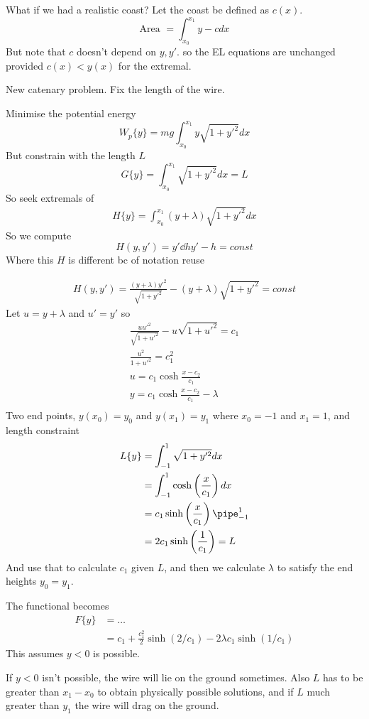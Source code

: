 \documentclass{X:/Documents/Coding/Latex/myassignment}
\begin{document}
What if we had a realistic coast?
Let the coast be defined as $c(x)$.
\[\text{Area } = \int_{x_0}^{x_1} y - c dx\]
But note that $c$ doesn't depend on $y,y'$. so the EL equations are unchanged provided $c(x) < y(x)$ for the extremal.


New catenary problem. Fix the length of the wire.

Minimise the potential energy
\[W_p\{y\} = mg \int_{x_0}^{x_1} y\sqrt{1+y'^2} dx\]
But constrain with the length $L$
\[G\{y\} = \int_{x_0}^{x_1} \sqrt{1+y'^2} dx = L\]
So seek extremals of
\begin{align*}
	H\{y\} = \int_{x_0}^{x_1} (y+\lambda) \sqrt{1+y'^2} dx
\end{align*}
So we compute
\[H(y,y') = y' \dd h{y'} - h = const\]
Where this $H$ is different bc of notation reuse

\begin{align*}
	H(y,y') = \frac{(y+\lambda) y'^2}{\sqrt{1+y'^2}} - (y+\lambda)\sqrt{1+y'^2} = const
\end{align*}
Let $ u = y+\lambda$ and $u' = y'$ so
\begin{align*}
	\frac{uu'^2}{\sqrt{1+u'^2}} - u\sqrt{1+u'^2} = c_1\\
	\frac{u^2}{1+u'^2} = c_1^2\\
	u = c_1 \cosh \frac{x-c_2}{c_1}\\
	y = c_1 \cosh \frac{x-c_2}{c_1} - \lambda\\
\end{align*}
Two end points, $y(x_0) = y_0$ and $y(x_1) = y_1$ where $x_0 = -1$ and $x_1 = 1$, and length constraint
\begin{align*}
	L\{y\} &= \int_{-1}^1 \sqrt{1+y'^2} dx\\
	&= \int_{-1}^1 \cosh \left(\frac{x}{c_1}\right) dx\\
	&= c_1 \sinh \left(\frac{x}{c_1}\right)\pipe_{-1}^1\\
	&= 2c_1 \sinh\left(\frac{1}{c_1}\right) = L
\end{align*}
And use that to calculate $c_1$ given $L$, and then we calculate $\lambda$ to satisfy the end heights $y_0=y_1$.

The functional becomes
\begin{align*}
	F\{y\} &= \ldots\\
	&=c_1 + \frac{c_1^2}{2} \sinh(2/c_1) - 2 \lambda c_1 \sinh(1/c_1)
\end{align*}
This assumes $y<0$ is possible.



If $y<0$ isn't possible, the wire will lie on the ground sometimes. 
Also $L$ has to be greater than $x_1 - x_0$ to obtain physically possible solutions, and if $L$ much greater than $y_1$ the wire will drag on the ground. 
\end{document}
